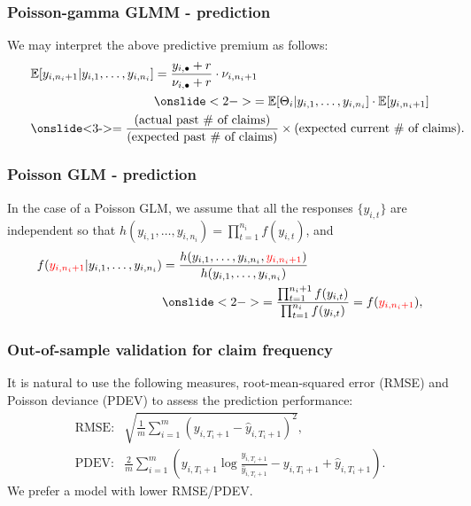 \documentclass[ignorenonframetext,]{beamer}
\begin{document}
\begin{frame}
\frametitle{Poisson-gamma GLMM - prediction}

We may interpret the above predictive premium as follows:
\begin{align*}
\mathbb{E}[y_{i,n_i+1}|y_{i,1}, \ldots, y_{i,n_i}] &= \frac{y_{i,\bullet}+r}{\nu_{i,\bullet}+r} \cdot \nu_{i,n_i+1} \\
& \onslide<2->{= \mathbb{E}[\Theta_i|y_{i,1}, \ldots, y_{i,n_i}] \cdot \mathbb{E}[y_{i,n_i+1}]} \\
\omit\rlap{\onslide<3->{$\displaystyle = \frac{\text{(actual past \# of claims)}}{\text{(expected past \# of claims)}} \times \text{(expected current \# of claims)}.$}}
\end{align*}


\end{frame}

\begin{frame}
\frametitle{Poisson GLM - prediction}

In the case of a Poisson GLM, we assume that all the responses $\{y_{i,t}\}$ are independent so that $h(y_{i,1}, \ldots, y_{i,n_i}) = \prod_{t=1}^{n_i} f(y_{i,t})$, and
\begin{align*}
f({\color{red}y_{i,n_i+1}}|y_{i,1}, \ldots, y_{i,n_i}) &= \frac{h(y_{i,1}, \ldots, y_{i,n_i}, {\color{red}y_{i,n_i+1}})}{h(y_{i,1}, \ldots, y_{i,n_i})} \\
& \onslide<2->{= \frac{\prod_{t=1}^{n_i+1} f(y_{i,t})}{\prod_{t=1}^{n_i} f(y_{i,t})} = f({\color{red}y_{i,n_i+1}}),}
\end{align*}

\end{frame}

\begin{frame}
\frametitle{Out-of-sample validation for claim frequency}

It is natural to use the following measures, root-mean-squared error (RMSE) and Poisson deviance (PDEV) to assess the prediction performance:
\begin{align*}
\text{RMSE} : & \sqrt{\frac{1}{m} \sum_{i=1}^m (y_{i,T_i+1} - \hat{y}_{i,T_i+1})^2}, \\
\text{PDEV} : & \frac{2}{m} \sum_{i=1}^m \left( y_{i,T_i+1} \log \frac{y_{i,T_i+1}}{\hat{y}_{i,T_i+1}} - y_{i,T_i+1} + \hat{y}_{i,T_i+1} \right).
\end{align*}
We prefer a model with lower RMSE/PDEV.

\end{frame}
\end{document}
